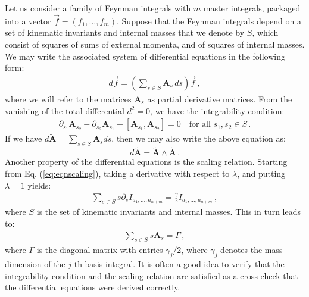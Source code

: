 \documentclass{article}
\begin{document}
Let us consider a family of Feynman integrals with $m$ master integrals, packaged into a vector $\vec{f} = (f_1,\ldots,f_m)$. Suppose that the Feynman integrals depend on a set of kinematic invariants and internal masses that we denote by $S$, which consist of squares of sums of external momenta, and of squares of internal masses. We may write the associated system of differential equations in the following form:
\begin{align}
    \label{eq:basicdeqns}
    d \vec{f} = \left(\sum_{s\in S}\mathbf{A}_s\,ds\right) \vec{f}\,,
\end{align}
where we will refer to the matrices $\mathbf{A}_s$ as partial derivative matrices. From the vanishing of the total differential $d^2 = 0$, we have the integrability condition:
\begin{align}
    \label{eq:deqnintegrability}
    \partial_{s_1} \mathbf{A}_{s_2} - \partial_{s_2} \mathbf{A}_{s_1} + [\mathbf{A}_{s_1},\mathbf{A}_{s_2}] = 0\quad\text{for all }s_1,s_2\in S\,.
\end{align}
If we have $d\tilde{\mathbf{A}} = \sum_{s \in S} \mathbf{A}_{s} d s$, then we may also write the above equation as:
\begin{equation}
    d\tilde{\mathbf{A}}=\tilde{\mathbf{A}} \wedge \tilde{\mathbf{A}}\,.
\end{equation}
Another property of the differential equations is the scaling relation. Starting from Eq. (\ref{eq:eqnscaling}), taking a derivative with respect to $\lambda$, and putting $\lambda = 1$ yields:
\begin{align}
    \sum_{s \in S} s\partial_s I_{ a_1, \ldots, a_{n+m}}=\frac{\gamma}{2} I
    _{ a_1, \ldots, a_{n+m}}\,,
\end{align}
where $S$ is the set of kinematic invariants and internal masses. This in turn leads to:
\begin{align}
    \sum_{s \in S} s \mathbf{A}_s = \Gamma\,,
\end{align}
where $\Gamma$ is the diagonal matrix with entries $\gamma_j/2$, where $\gamma_j$ denotes the mass dimension of the $j$-th basis integral. It is often a good idea to verify that the integrability condition and the scaling relation are satisfied as a cross-check that the differential equations were derived correctly.
\end{document}
